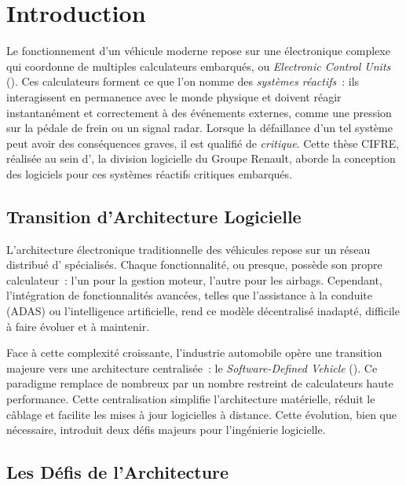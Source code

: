 \section{Introduction}

Le fonctionnement d'un véhicule moderne repose sur une électronique complexe qui coordonne de
multiples calculateurs embarqués, ou \emph{Electronic Control Units} (\ecus). Ces calculateurs
forment ce que l'on nomme des \emph{systèmes réactifs}~: ils interagissent en permanence avec le
monde physique et doivent réagir instantanément et correctement à des événements externes, comme une
pression sur la pédale de frein ou un signal radar. Lorsque la défaillance d'un tel système peut
avoir des conséquences graves, il est qualifié de \emph{critique}. Cette thèse CIFRE, réalisée au
sein d'\ampere, la division logicielle du Groupe Renault, aborde la conception des logiciels pour
ces systèmes réactifs critiques embarqués.

\subsection{Transition d'Architecture Logicielle}

L'architecture électronique traditionnelle des véhicules repose sur un réseau distribué d'\ecus
spécialisés. Chaque fonctionnalité, ou presque, possède son propre calculateur~: l'un pour la
gestion moteur, l'autre pour les airbags. Cependant, l'intégration de fonctionnalités avancées,
telles que l'assistance à la conduite (ADAS) ou l'intelligence artificielle, rend ce modèle
décentralisé inadapté, difficile à faire évoluer et à maintenir.

Face à cette complexité croissante, l'industrie automobile opère une transition majeure vers une
architecture centralisée~: le \emph{Software-Defined Vehicle} (\sdv). Ce paradigme remplace de
nombreux \ecus par un nombre restreint de calculateurs haute performance. Cette centralisation
simplifie l'architecture matérielle, réduit le câblage et facilite les mises à jour logicielles à
distance. Cette évolution, bien que nécessaire, introduit deux défis majeurs pour l'ingénierie
logicielle.

\subsection{Les Défis de l'Architecture \sdv}

